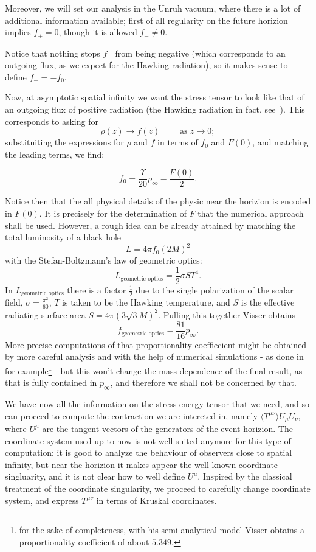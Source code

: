 Moreover, we will set our analysis in the Unruh vacuum, where there is a lot of additional information available; first of all regularity on the future horizion implies \(f_+ = 0\), though it is allowed \(f_- \neq 0\).

Notice that nothing stops \(f_-\) from being negative (which corresponds to an outgoing flux, as we expect for the Hawking radiation), so it makes sense to define \(f_- = -f_0\). 

Now, at asymptotic spatial infinity we want the stress tensor to look like that of an outgoing flux of positive radiation (the Hawking radiation in fact, see~\cite[]{christensen1977trace}). This corresponds to asking for
\[
\rho(z) \rightarrow f(z) \quad\quad \text{ as } z \rightarrow 0;    
\]
substituiting the expressions for \(\rho\) and \(f\) in terms of \(f_0\) and \(F(0)\), and matching the leading terms, we find:

\[
f_0 = \frac{\Upsilon}{20}p_{\infty} - \frac{F(0)}{2}.
\]

Notice then that the all physical details of the physic near the horizion is encoded in \(F(0)\). It is precisely for the determination of \(F\) that the numerical approach shall be used. However, a rough idea can be already attained by matching the total luminosity of a black hole
\[
    L = 4\pi f_0(2M)^2
\]
with the Stefan-Boltzmann's law of geometric optics:
\[
L_{\text{geometric optics}} = \frac{1}{2}\sigma S T^4.  
\]
In \(L_{\text{geometric optics}}\) there is a factor \(\frac{1}{2}\) due to the single polarization of the scalar field, \(\sigma = \frac{\pi^2}{60}\), \(T\) is taken to be the Hawking temperature, and \(S\) is the effective radiating surface area \(S = 4\pi(3\sqrt{3}M)^2\). Pulling this together Visser obtains
\[
 f_{\text{geometric optics}} = \frac{81}{16}p_{\infty}.
\]
More precise computations of that proportionality coeffiecient might be obtained by more careful analysis and with the help of numerical simulations - as done in~\cite[]{visser1997gravitational} for example\footnote{for the sake of completeness, with his semi-analytical model Visser obtains a proportionality coefficient of about \(5.349\).} - but this won't change the mass dependence of the final result, as that is fully contained in \(p_{\infty}\), and therefore we shall not be concerned by that.

We have now all the information on the stress energy tensor that we need, and so can proceed to compute the contraction we are intereted in, namely \(\langle T^{\mu\nu}\rangle U_{\mu}U_{\nu}\), where \(U^{\mu}\) are the tangent vectors of the generators of the event horizion.
The coordinate system used up to now is not well suited anymore for this type of computation: it is good to analyze the behaviour of observers close to spatial infinity, but near the horizion it makes appear the well-known coordinate singluarity, and it is not clear how to well define \(U^{\mu}\). Inspired by the classical treatment of the coordinate singularity, we proceed to carefully change coordinate system, and express \(T^{\mu\nu}\) in terms of Kruskal coordinates.

